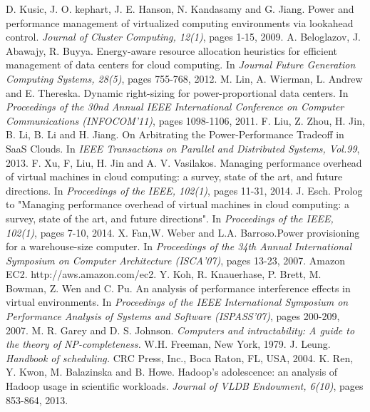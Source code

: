 \documentclass[10pt,journal]{IEEEtran}
\begin{document}
\begin{thebibliography}{99}
D. Kusic, J. O. kephart, J. E. Hanson, N. Kandasamy and G. Jiang. Power and performance management of virtualized computing environments via lookahead control. \emph{Journal of Cluster Computing, 12(1)}, pages 1-15, 2009.
A. Beloglazov, J. Abawajy, R. Buyya. Energy-aware resource allocation heuristics for efficient management of data centers for cloud computing. In \emph{Journal Future Generation Computing Systems, 28(5)}, pages 755-768, 2012.
M. Lin, A. Wierman, L. Andrew and E. Thereska. Dynamic right-sizing for power-proportional data centers. In \emph{Proceedings of the 30nd Annual IEEE International Conference on Computer Communications (INFOCOM{'}11)}, pages 1098-1106, 2011.
F. Liu, Z. Zhou, H. Jin, B. Li, B. Li and H. Jiang. On Arbitrating the Power-Performance Tradeoff in SaaS Clouds. In \emph{IEEE Transactions on Parallel and Distributed Systems, Vol.99}, 2013.
F. Xu, F, Liu, H. Jin and A. V. Vasilakos. Managing performance overhead of virtual machines in cloud computing: a survey, state of the art, and future directions. In \emph{Proceedings of the IEEE, 102(1)}, pages 11-31, 2014.
J. Esch. Prolog to "Managing performance overhead of virtual machines in cloud computing: a survey, state of the art, and future directions". In \emph{Proceedings of the IEEE, 102(1)}, pages 7-10, 2014.
X. Fan,W. Weber and L.A. Barroso.Power provisioning for a warehouse-size computer. In \emph{Proceedings of the 34th Annual International Symposium on Computer Architecture (ISCA{'}07)}, pages 13-23, 2007.
Amazon EC2. http://aws.amazon.com/ec2.
Y. Koh, R. Knauerhase, P. Brett, M. Bowman, Z. Wen and C. Pu. An analysis of performance interference effects in virtual environments. In \emph{Proceedings of the IEEE International Symposium on Performance Analysis of Systems and Software (ISPASS{'}07)}, pages 200-209, 2007.
M. R. Garey and D. S. Johnson. \emph{Computers and intractability: A guide to the theory of NP-completeness.} W.H. Freeman, New York, 1979.
J. Leung. \emph{Handbook of scheduling.} CRC Press, Inc., Boca Raton, FL, USA, 2004.
K. Ren, Y. Kwon, M. Balazinska and B. Howe. Hadoop{'}s adolescence: an analysis of Hadoop usage in scientific workloads. \emph{Journal of VLDB Endowment, 6(10)}, pages 853-864, 2013.
\end{thebibliography}
\end{document}
